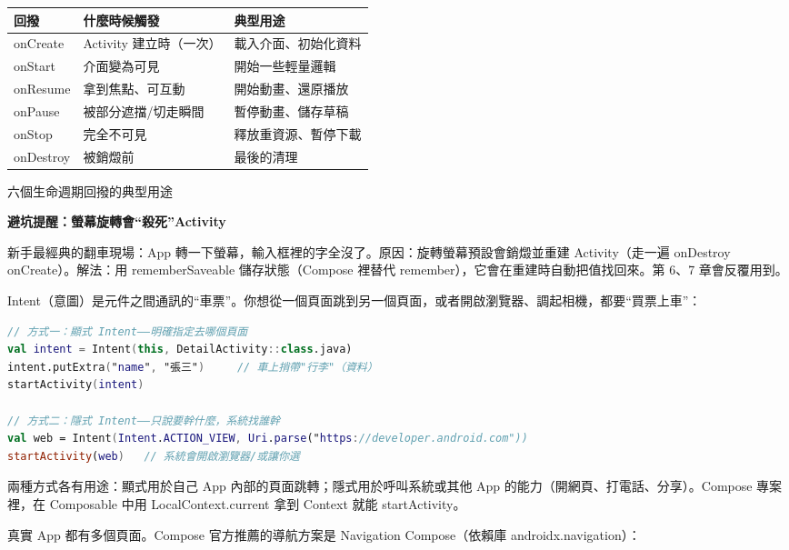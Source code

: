 \begin{center}
\begin{tabularx}{\linewidth}{|X|X|X|}
\hline
\textbf{回撥} & \textbf{什麼時候觸發} & \textbf{典型用途} \tabularnewline
\hline
onCreate & Activity 建立時（一次） & 載入介面、初始化資料 \tabularnewline
onStart & 介面變為可見 & 開始一些輕量邏輯 \tabularnewline
onResume & 拿到焦點、可互動 & 開始動畫、還原播放 \tabularnewline
onPause & 被部分遮擋/切走瞬間 & 暫停動畫、儲存草稿 \tabularnewline
onStop & 完全不可見 & 釋放重資源、暫停下載 \tabularnewline
onDestroy & 被銷燬前 & 最後的清理 \tabularnewline
\hline
\end{tabularx}
\end{center}

\begin{center}\small\color{gray}六個生命週期回撥的典型用途\end{center}

\textbf{避坑提醒：螢幕旋轉會“殺死”Activity}\par

新手最經典的翻車現場：App 轉一下螢幕，輸入框裡的字全沒了。原因：旋轉螢幕預設會銷燬並重建 Activity（走一遍 onDestroy onCreate）。解法：用 rememberSaveable 儲存狀態（Compose 裡替代 remember），它會在重建時自動把值找回來。第 6、7 章會反覆用到。


Intent（意圖）是元件之間通訊的“車票”。你想從一個頁面跳到另一個頁面，或者開啟瀏覽器、調起相機，都要“買票上車”：

\begin{lstlisting}[language=Kotlin]
// 方式一：顯式 Intent——明確指定去哪個頁面
val intent = Intent(this, DetailActivity::class.java)
intent.putExtra("name", "張三")     // 車上捎帶"行李"（資料）
startActivity(intent)

// 方式二：隱式 Intent——只說要幹什麼，系統找誰幹
val web = Intent(Intent.ACTION_VIEW, Uri.parse("https://developer.android.com"))
startActivity(web)   // 系統會開啟瀏覽器/或讓你選
\end{lstlisting}

兩種方式各有用途：顯式用於自己 App 內部的頁面跳轉；隱式用於呼叫系統或其他 App 的能力（開網頁、打電話、分享）。Compose 專案裡，在 Composable 中用 LocalContext.current 拿到 Context 就能 startActivity。


真實 App 都有多個頁面。Compose 官方推薦的導航方案是 Navigation Compose（依賴庫 androidx.navigation）：

